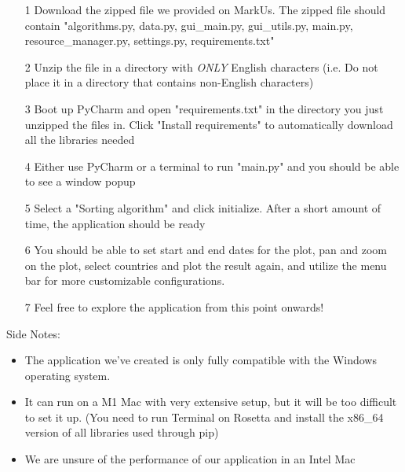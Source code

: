 \documentclass[fontsize=11pt]{article}
\begin{document}
    \begin{enumerate}
        \item [1]
            Download the zipped file we provided on MarkUs. The zipped file should contain "algorithms.py, data.py, gui\_main.py, gui\_utils.py, main.py, resource\_manager.py, settings.py, requirements.txt"

        \item [2]
            Unzip the file in a directory with \emph{ONLY} English characters (i.e. Do not place it in a directory that contains non-English characters)

        \item [3]
            Boot up PyCharm and open "requirements.txt" in the directory you just unzipped the files in. Click "Install requirements" to automatically download all the libraries needed

        \item [4]
            Either use PyCharm or a terminal to run "main.py" and you should be able to see a window popup

        \item [5]
            Select a "Sorting algorithm" and click initialize. After a short amount of time, the application should be ready

        \item [6]
            You should be able to set start and end dates for the plot, pan and zoom on the plot, select countries and plot the result again, and utilize the menu bar for more customizable configurations.

        \item [7]
            Feel free to explore the application from this point onwards!

    \end{enumerate}

    Side Notes:

    \begin{itemize}
        \item The application we've created is only fully compatible with the Windows operating system.
        \item It can run on a M1 Mac with very extensive setup, but it will be too difficult to set it up. (You need to run Terminal on Rosetta and install the x86\_64 version of all libraries used through pip)
        \item We are unsure of the performance of our application in an Intel Mac
    \end{itemize}
\end{document}

